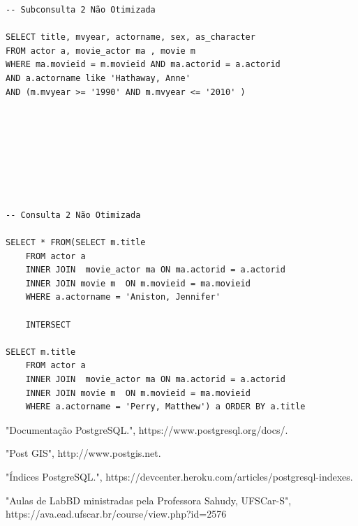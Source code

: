 \documentclass[
	12pt,				%
	oneside,			%
	a4paper,			%
	brazil				%
	]{abntex2}
\begin{document}
\begin{lstlisting}
-- Subconsulta 2 Não Otimizada

SELECT title, mvyear, actorname, sex, as_character 
FROM actor a, movie_actor ma , movie m
WHERE ma.movieid = m.movieid AND ma.actorid = a.actorid
AND a.actorname like 'Hathaway, Anne' 
AND (m.mvyear >= '1990' AND m.mvyear <= '2010' )








-- Consulta 2 Não Otimizada

SELECT * FROM(SELECT m.title
	FROM actor a 
	INNER JOIN  movie_actor ma ON ma.actorid = a.actorid 
    INNER JOIN movie m  ON m.movieid = ma.movieid 
    WHERE a.actorname = 'Aniston, Jennifer'
 
	INTERSECT
        
SELECT m.title
	FROM actor a 
	INNER JOIN  movie_actor ma ON ma.actorid = a.actorid 
    INNER JOIN movie m  ON m.movieid = ma.movieid 
    WHERE a.actorname = 'Perry, Matthew') a ORDER BY a.title

\end{lstlisting}


\begin{thebibliography}{4}

 "Documentação PostgreSQL.", https://www.postgresql.org/docs/.

 "Post GIS", http://www.postgis.net.

 "Índices PostgreSQL.", https://devcenter.heroku.com/articles/postgresql-indexes.


 "Aulas de LabBD ministradas pela Professora Sahudy, UFSCar-S", https://ava.ead.ufscar.br/course/view.php?id=2576
\end{thebibliography}




\printindex
\end{document}
